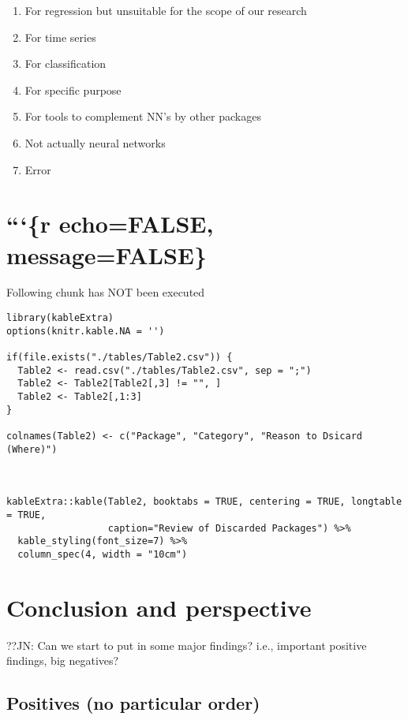 \begin{enumerate}
\def\labelenumi{\arabic{enumi}.}
\tightlist
\item
  For regression but unsuitable for the scope of our research
\item
  For time series
\item
  For classification
\item
  For specific purpose
\item
  For tools to complement NN's by other packages
\item
  Not actually neural networks
\item
  Error 
\end{enumerate}

\hypertarget{r-echofalse-messagefalse}{%
\section{```\{r echo=FALSE,
message=FALSE\}}\label{r-echofalse-messagefalse}}

Following chunk has NOT been executed

\begin{verbatim}
library(kableExtra)
options(knitr.kable.NA = '')

if(file.exists("./tables/Table2.csv")) {  
  Table2 <- read.csv("./tables/Table2.csv", sep = ";")
  Table2 <- Table2[Table2[,3] != "", ]
  Table2 <- Table2[,1:3]
}

colnames(Table2) <- c("Package", "Category", "Reason to Dsicard (Where)")



kableExtra::kable(Table2, booktabs = TRUE, centering = TRUE, longtable = TRUE,
                  caption="Review of Discarded Packages") %>%
  kable_styling(font_size=7) %>%
  column_spec(4, width = "10cm")
\end{verbatim}

\hypertarget{conclusion-and-perspective}{%
\section{Conclusion and perspective}\label{conclusion-and-perspective}}

??JN: Can we start to put in some major findings? i.e., important
positive findings, big negatives?

\hypertarget{positives-no-particular-order}{%
\subsection{Positives (no particular
order)}\label{positives-no-particular-order}}

